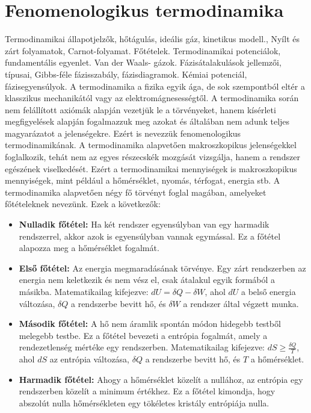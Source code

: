 \documentclass[a4paper,12pt]{article}
\begin{document}
\section{Fenomenologikus termodinamika}
Termodinamikai állapotjelzők, hőtágulás, ideális gáz, kinetikus modell., Nyílt és zárt folyamatok, Carnot-folyamat. Főtételek.
Termodinamikai potenciálok, fundamentális egyenlet. Van der Waals- gázok. Fázisátalakulások jellemzői, típusai, Gibbs-féle fázisszabály, fázisdiagramok.
Kémiai potenciál, fázisegyensúlyok.
\newline
\newline
A termodinamika a fizika egyik ága, de sok szempontból eltér a klasszikus mechanikától vagy az elektromágnesességtől. A termodinamika során nem felállított axiómák alapján
vezetjük le a törvényeket, hanem kísérleti megfigyelések alapján fogalmazzuk meg azokat és általában nem adunk teljes magyarázatot a jelenségekre. Ezért is nevezzük fenomenologikus termodinamikának. A termodinamika alapvetően makroszkopikus jelenségekkel foglalkozik, tehát nem az egyes részecskék mozgását vizsgálja,
hanem a rendszer egészének viselkedését. Ezért a termodinamikai mennyiségek is makroszkopikus mennyiségek, mint például a hőmérséklet, nyomás, térfogat, energia stb.
A termodinamika alapvetően négy fő törvényt foglal magában, amelyeket főtételeknek nevezünk. Ezek a következők:
\begin{itemize}
    \item \textbf{Nulladik főtétel:} Ha két rendszer egyensúlyban van egy harmadik rendszerrel, akkor azok is egyensúlyban vannak egymással. Ez a főtétel alapozza meg a hőmérséklet fogalmát.
    \item \textbf{Első főtétel:} Az energia megmaradásának törvénye. Egy zárt rendszerben az energia nem keletkezik és nem vész el, csak átalakul egyik formából a másikba. Matematikailag kifejezve: $dU = \delta Q - \delta W$, ahol $dU$ a belső energia változása, $\delta Q$ a rendszerbe bevitt hő, és $\delta W$ a rendszer által végzett munka.
    \item \textbf{Második főtétel:} A hő nem áramlik spontán módon hidegebb testből melegebb testbe. Ez a főtétel bevezeti a entrópia fogalmát, amely a rendezetlenség mértéke egy rendszerben. Matematikailag kifejezve: $dS \geq \frac{\delta Q}{T}$, ahol $dS$ az entrópia változása, $\delta Q$ a rendszerbe bevitt hő, és $T$ a hőmérséklet.
    \item \textbf{Harmadik főtétel:} Ahogy a hőmérséklet közelít a nullához, az entrópia egy rendszerben közelít a minimum értékhez. Ez a főtétel kimondja, hogy abszolút nulla hőmérsékleten egy tökéletes kristály entrópiája nulla.
\end{itemize}
\end{document}
